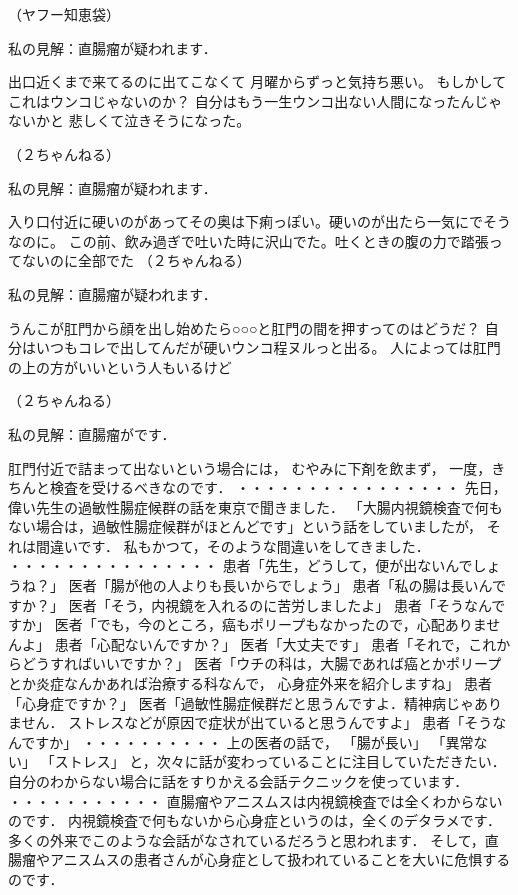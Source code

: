 （ヤフー知恵袋）


私の見解：直腸瘤が疑われます． 

出口近くまで来てるのに出てこなくて 
月曜からずっと気持ち悪い。 
もしかしてこれはウンコじゃないのか？ 
自分はもう一生ウンコ出ない人間になったんじゃないかと 
悲しくて泣きそうになった。

（２ちゃんねる）


私の見解：直腸瘤が疑われます． 

入り口付近に硬いのがあってその奥は下痢っぽい。硬いのが出たら一気にでそうなのに。 
この前、飲み過ぎで吐いた時に沢山でた。吐くときの腹の力で踏張ってないのに全部でた 
（２ちゃんねる）


私の見解：直腸瘤が疑われます． 

うんこが肛門から顔を出し始めたら○○○と肛門の間を押すってのはどうだ？ 
自分はいつもコレで出してんだが硬いウンコ程ヌルっと出る。 
人によっては肛門の上の方がいいという人もいるけど

（２ちゃんねる）


私の見解：直腸瘤がです． 

肛門付近で詰まって出ないという場合には，
むやみに下剤を飲まず，
一度，きちんと検査を受けるべきなのです．
・・・・・・・・・・・・・・・・
先日，偉い先生の過敏性腸症候群の話を東京で聞きました．
「大腸内視鏡検査で何もない場合は，過敏性腸症候群がほとんどです」という話をしていましたが，
それは間違いです．
私もかつて，そのような間違いをしてきました．
・・・・・・・・・・・・・・・
患者「先生，どうして，便が出ないんでしょうね？」
医者「腸が他の人よりも長いからでしょう」
患者「私の腸は長いんですか？」
医者「そう，内視鏡を入れるのに苦労しましたよ」
患者「そうなんですか」
医者「でも，今のところ，癌もポリープもなかったので，心配ありませんよ」
患者「心配ないんですか？」
医者「大丈夫です」
患者「それで，これからどうすればいいですか？」
医者「ウチの科は，大腸であれば癌とかポリープとか炎症なんかあれば治療する科なんで，
心身症外来を紹介しますね」
患者「心身症ですか？」
医者「過敏性腸症候群だと思うんですよ．精神病じゃありません．
ストレスなどが原因で症状が出ていると思うんですよ」
患者「そうなんですか」
・・・・・・・・・・
上の医者の話で，
「腸が長い」
「異常ない」
「ストレス」
と，次々に話が変わっていることに注目していただきたい．
自分のわからない場合に話をすりかえる会話テクニックを使っています．
・・・・・・・・・・・
直腸瘤やアニスムスは内視鏡検査では全くわからないのです．
内視鏡検査で何もないから心身症というのは，全くのデタラメです．
多くの外来でこのような会話がなされているだろうと思われます．
そして，直腸瘤やアニスムスの患者さんが心身症として扱われていることを大いに危惧するのです．

